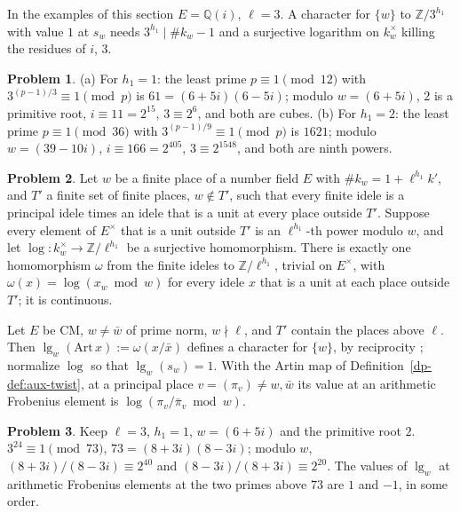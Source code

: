 \documentclass[reqno]{amsart}
\theoremstyle{definition}
\newtheorem{problem}{Problem}[section]
\theoremstyle{plain}
\newcommand{\Z}{\mathbb{Z}}
\newcommand{\Q}{\mathbb{Q}}
\begin{document}
In the examples of this section \(E = \Q(i)\), \(\ell = 3\).  A character for \(\{w\}\) to \(\Z/3^{h_1}\) with value \(1\) at \(s_w\) needs \(3^{h_1} \mid \#k_w - 1\) and a surjective logarithm on \(k_w^\times\) killing the residues of \(i\), \(3\).

\begin{problem}\label{pr:sixty-one}
\textup{(a)} For \(h_1 = 1\): the least prime \(p \equiv 1 \pmod{12}\) with \(3^{(p-1)/3} \equiv 1 \pmod p\) is \(61 = (6+5i)(6-5i)\); modulo \(w = (6+5i)\), \(2\) is a primitive root, \(i \equiv 11 = 2^{15}\), \(3 \equiv 2^{6}\), and both are cubes.  \textup{(b)} For \(h_1 = 2\): the least prime \(p \equiv 1 \pmod{36}\) with \(3^{(p-1)/9} \equiv 1 \pmod p\) is \(1621\); modulo \(w = (39 - 10i)\), \(i \equiv 166 = 2^{405}\), \(3 \equiv 2^{1548}\), and both are ninth powers.
\end{problem}

\begin{problem}\label{pr:kummer}
Let \(w\) be a finite place of a number field \(E\) with \(\#k_w = 1 + \ell^{h_1}k'\), and \(T'\) a finite set of finite places, \(w \notin T'\), such that every finite idele is a principal idele times an idele that is a unit at every place outside \(T'\).  Suppose every element of \(E^\times\) that is a unit outside \(T'\) is an \(\ell^{h_1}\)-th power modulo \(w\), and let \(\log \colon k_w^\times \to \Z/\ell^{h_1}\) be a surjective homomorphism.  There is exactly one homomorphism \(\omega\) from the finite ideles to \(\Z/\ell^{h_1}\), trivial on \(E^\times\), with \(\omega(x) = \log(x_w \bmod w)\) for every idele \(x\) that is a unit at each place outside \(T'\); it is continuous.
\end{problem}

Let \(E\) be CM, \(w \ne \bar w\) of prime norm, \(w \nmid \ell\), and \(T'\) contain the places above \(\ell\).  Then \(\lg_w(\mathrm{Art}\,x) := \omega(x/\bar x)\) defines a character for \(\{w\}\), by reciprocity \cite[Ch.~VI]{Ne}; normalize \(\log\) so that \(\lg_w(s_w) = 1\).  With the Artin map of Definition~\ref{dp-def:aux-twist}, at a principal place \(v = (\pi_v) \ne w, \bar w\) its value at an arithmetic Frobenius element is \(\log(\pi_v/\bar\pi_v \bmod w)\).

\begin{problem}\label{pr:frobenius-value}
Keep \(\ell = 3\), \(h_1 = 1\), \(w = (6+5i)\) and the primitive root \(2\).  \(3^{24} \equiv 1 \pmod{73}\), \(73 = (8+3i)(8-3i)\); modulo \(w\), \((8+3i)/(8-3i) \equiv 2^{40}\) and \((8-3i)/(8+3i) \equiv 2^{20}\).  The values of \(\lg_w\) at arithmetic Frobenius elements at the two primes above \(73\) are \(1\) and \(-1\), in some order.
\end{problem}
\end{document}
